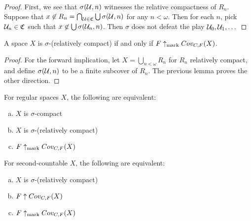   \begin{proof}
    First, we see that $\sigma(\mathcal{U},n)$ witnesses the relative compactness of $R_n$. Suppose that $x \not\in R_n = \bigcap_{\mathcal{U}\in\mathfrak{C}} \bigcup\sigma(\mathcal{U},n)$ for any $n<\omega$. Then for each $n$, pick $\mathcal{U}_n\in\mathfrak{C}$ such that $x\not\in \bigcup\sigma(\mathcal{U}_n,n)$. Then $\sigma$ does not defeat the play $\mathcal{U}_0,\mathcal{U}_1,\dots$
  \end{proof}

  \begin{theorem}
    A space $X$ is $\sigma$-(relatively compact) if and only if $F \uparrow_{\text{mark}} Cov_{C,F}(X)$.
  \end{theorem}

  \begin{proof}
    For the forward implication, let $X=\bigcup_{n<\omega}R_n$ for $R_n$ relatively compact, and define $\sigma(\mathcal{U},n)$ to be a finite subcover of $R_n$. The previous lemma proves the other direction.
  \end{proof}

  \begin{corollary}
    For regular spaces $X$, the following are equivalent:
      \begin{enumerate}[(a)]
        \item $X$ is $\sigma$-compact
        \item $X$ is $\sigma$-(relatively compact)
        \item $F \uparrow_{\text{mark}} Cov_{C,F}(X)$
      \end{enumerate}
  \end{corollary}

  \begin{theorem}
    For second-countable $X$, the following are equivalent:
      \begin{enumerate}[(a)]
        \item $X$ is $\sigma$-(relatively compact)
        \item $F \uparrow Cov_{C,F}(X)$
        \item $F\uparrow_{\text{mark}} Cov_{C,F}(X)$
      \end{enumerate}
  \end{theorem}

